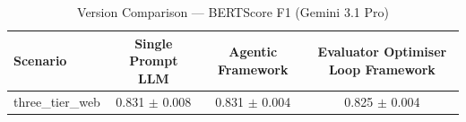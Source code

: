 \begin{table}[htbp]
\centering
\caption{Version Comparison — BERTScore F1 (Gemini 3.1 Pro)}
\label{tab:version_bert_score_f1_gemini}
\begin{tabular}{lccc}
\toprule
Scenario & Single Prompt LLM & Agentic Framework & Evaluator Optimiser Loop Framework \\
\midrule
three\_tier\_web & 0.831 $\pm$ 0.008 & 0.831 $\pm$ 0.004 & 0.825 $\pm$ 0.004 \\
\bottomrule
\end{tabular}
\end{table}